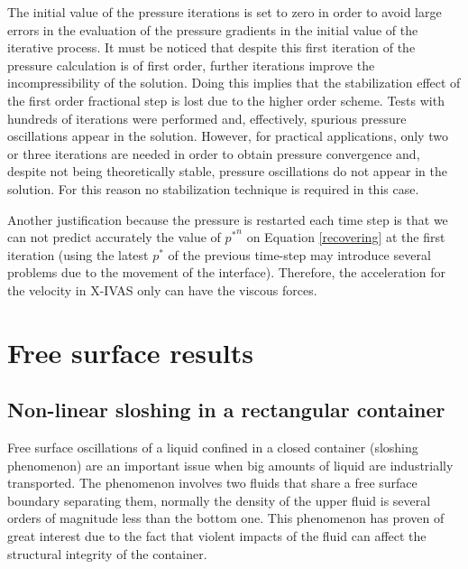 \documentclass[a4paper,conference]{IEEEtran}
\begin{document}
The initial value of the pressure iterations is set to zero in order to avoid large errors in the evaluation of the pressure gradients in the initial value of the iterative process. It must be noticed that despite this first iteration of the pressure calculation is
of first order, further iterations improve the incompressibility of the solution. Doing this implies that the stabilization effect of the first order fractional step is lost due to the higher order scheme. Tests with hundreds of iterations were performed and, effectively,
spurious pressure oscillations appear in the solution. However, for practical applications, only two or three iterations are needed in order to obtain pressure convergence and, despite not being theoretically stable, pressure oscillations do not appear in the solution. For this reason no stabilization technique is required in this case.

Another justification because the pressure is restarted each time step is that we can not predict accurately the value of ${p^*}^n$ on Equation \ref{recovering} at the first iteration (using the latest $p^*$ of the previous time-step may introduce several problems due to the movement of the interface). Therefore, the acceleration for the velocity in X-IVAS only can have the viscous forces.



\section{Free surface results}


\subsection{Non-linear sloshing in a rectangular container}%

Free surface oscillations of a liquid confined in a closed container (sloshing phenomenon) are an important issue when big amounts of liquid are industrially transported. The phenomenon involves two fluids that share a free surface boundary separating them, normally the density of the upper fluid is several orders of magnitude less than the bottom one. This phenomenon has proven of great interest due to the fact that violent impacts of the fluid can affect the structural integrity of the container.
\end{document}
